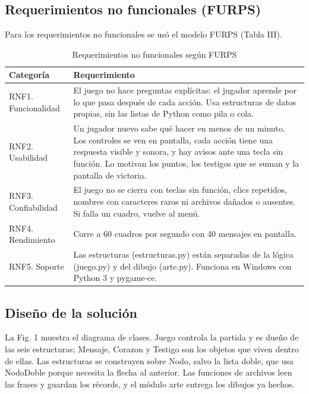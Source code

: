 \documentclass[conference]{IEEEtran}
\begin{document}
\subsection{Requerimientos no funcionales (FURPS)}

Para los requerimientos no funcionales se usó el modelo FURPS (Tabla III).

\begin{table}[!htbp]
\centering
\caption{Requerimientos no funcionales según FURPS}
\footnotesize
\begin{tabularx}{\textwidth}{|P{2.6cm}|X|}
\hline
\textbf{Categoría} & \textbf{Requerimiento} \\ \hline
RNF1. Funcionalidad & El juego no hace preguntas explícitas: el jugador aprende por lo que pasa después de cada acción. Usa estructuras de datos propias, sin las listas de Python como pila o cola. \\ \hline
RNF2. Usabilidad & Un jugador nuevo sabe qué hacer en menos de un minuto. Los controles se ven en pantalla, cada acción tiene una respuesta visible y sonora, y hay avisos ante una tecla sin función. Lo motivan los puntos, los testigos que se suman y la pantalla de victoria. \\ \hline
RNF3. Confiabilidad & El juego no se cierra con teclas sin función, clics repetidos, nombres con caracteres raros ni archivos dañados o ausentes. Si falla un cuadro, vuelve al menú. \\ \hline
RNF4. Rendimiento & Corre a 60 cuadros por segundo con 40 mensajes en pantalla. \\ \hline
RNF5. Soporte & Las estructuras (estructuras.py) están separadas de la lógica (juego.py) y del dibujo (arte.py). Funciona en Windows con Python 3 y pygame-ce. \\ \hline
\end{tabularx}
\end{table}

\subsection{Diseño de la solución}

La Fig. 1 muestra el diagrama de clases. Juego controla la partida y es dueño de las seis estructuras; Mensaje, Corazon y Testigo son los objetos que viven dentro de ellas. Las estructuras se construyen sobre Nodo, salvo la lista doble, que usa NodoDoble porque necesita la flecha al anterior. Las funciones de archivos leen las frases y guardan los récords, y el módulo arte entrega los dibujos ya hechos.
\end{document}
